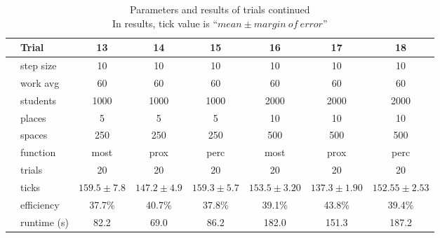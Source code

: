 \documentclass[11pt]{article} %
\begin{document}
\begin{table}[]
\footnotesize
\centering
\begin{tabular}{l|l|ccc|ccc}
 & Trial & 13 & 14 & 15 & 16 & 17 & 18  \\ \hline
  \parbox[t]{2mm}{} 
 & step size 	& 10  			& 10  			& 10 			& 10 					& 10 				& 10  \\
 & work avg 	& 60 			&  60 			& 60			& 60 					& 60 				& 60 \\
 & students 	& 1000 			& 1000 			& 1000 			& 2000 					& 2000 				& 2000 \\
 & places 		& 5 			& 5 			& 5 			& 10 					& 10 				& 10 \\
 & spaces 		& 250 			& 250 			& 250 			& 500 					& 500 				& 500 \\
 & function 	& most 			& prox 			& perc 			& most 					& prox 				& perc \\
 & trials 		& 20 			& 20 			& 20 			& 20 					& 20 				& 20 \\ \hline
\parbox[t]{2mm}{} 
 & ticks 		& $159.5\pm 7.8$ 	& $147.2\pm 4.9$ 	& $159.3\pm 5.7 $	& $153.5\pm 3.20 $	& $137.3\pm 1.90 $	& $152.55\pm 2.53$ \\
 & efficiency 	& 37.7\%			& 40.7\%			& 37.8\%				& 39.1\%				& 43.8\%				& 39.4\% \\
 & runtime (s) 	& 82.2			& 69.0			& 86.2				& 182.0			& 151.3			& 187.2
\end{tabular}
\caption{Parameters and results of trials continued \\ \footnotesize In results, tick value is ``$mean \pm margin \: of \: error$''}
\end{table}

\end{document}

